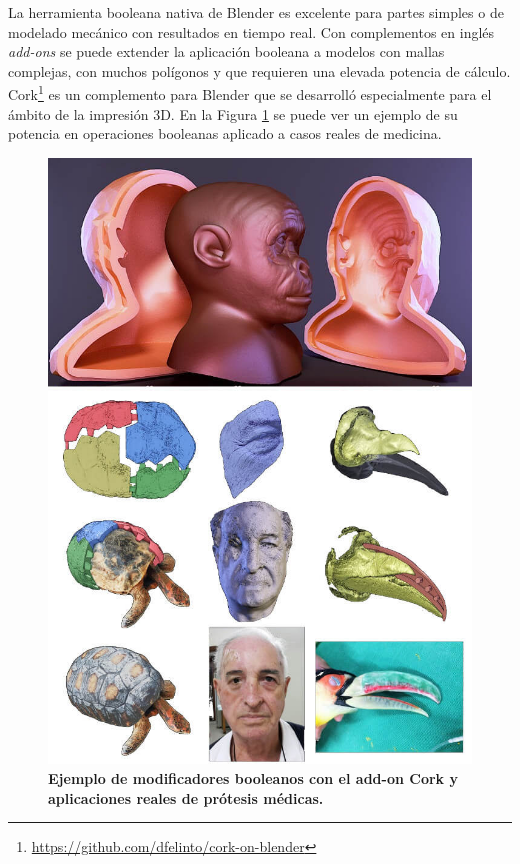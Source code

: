 La herramienta booleana nativa de Blender es excelente para partes simples o de modelado mecánico con resultados en tiempo real. Con complementos en inglés \textit{add-ons} se puede extender la aplicación booleana a modelos con mallas complejas, con muchos polígonos y que requieren una elevada potencia de cálculo.
Cork\footnote{\url{https://github.com/dfelinto/cork-on-blender}} es un complemento para Blender que se desarrolló especialmente para el ámbito de la impresión 3D. En la Figura \ref{fig:cork} se puede ver un ejemplo de su potencia en operaciones booleanas aplicado a casos reales de medicina.

\begin{figure}[h]
\includegraphics[width=12cm]{Img/Modelos/corkc.jpg}
\centering
\caption{\textbf{ \footnotesize{Ejemplo de modificadores booleanos con el add-on Cork y aplicaciones reales de prótesis médicas.   }}}
\label{fig:cork}
\end{figure}





